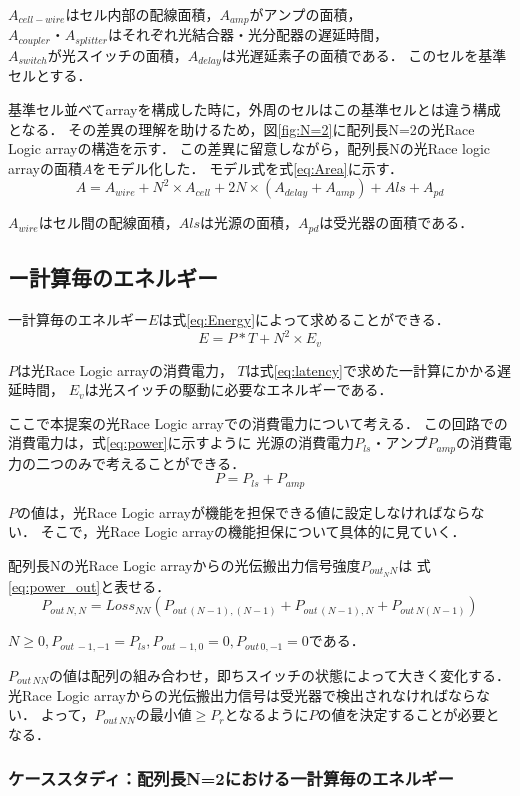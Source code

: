 $A_{cell-wire}はセル内部の配線面積，A_{amp}がアンプの面積，$
$A_{coupler}・A_{splitter}はそれぞれ光結合器・光分配器の遅延時間，$
$A_{switch}が光スイッチの面積，A_{delay}は光遅延素子の面積である．$
このセルを基準セルとする．

基準セル並べてarrayを構成した時に，外周のセルはこの基準セルとは違う構成となる．
その差異の理解を助けるため，図\ref{fig:N=2}に配列長N=2の光Race Logic arrayの構造を示す．
この差異に留意しながら，配列長Nの光Race logic arrayの面積$A$をモデル化した．
モデル式を式\ref{eq:Area}に示す．
\begin{equation}
A = A_{wire}+N^2 \times A_{cell} + 2N \times (A_{delay}+A_{amp}) +A{ls}+A_{pd}
\label{eq:Area}
\end{equation}

$A_{wire}はセル間の配線面積，A{ls}は光源の面積，A_{pd}は受光器の面積である．$

\subsection{ー計算毎のエネルギー}
一計算毎のエネルギー$E$は式\ref{eq:Energy}によって求めることができる．
\begin{equation}
E=P*T+N^2 \times E_{v}
\label{eq:Energy}
\end{equation}

$P$は光Race Logic arrayの消費電力，
$T$は式\ref{eq:latency}で求めた一計算にかかる遅延時間，
$E_{v}は光スイッチの駆動に必要なエネルギーである．$

ここで本提案の光Race Logic arrayでの消費電力について考える．
この回路での消費電力は，式\ref{eq:power}に示すように
$光源の消費電力P_{ls}・アンプP_{amp}$の消費電力の二つのみで考えることができる．
\begin{equation}
P=P_{ls}+P_{amp}
\label{eq:power}
\end{equation}

$P$の値は，光Race Logic arrayが機能を担保できる値に設定しなければならない．
そこで，光Race Logic arrayの機能担保について具体的に見ていく．

配列長Nの光Race Logic arrayからの光伝搬出力信号強度$P_{out_NN}$は
式\ref{eq:power_out}と表せる．
\begin{equation}
P_{out\,N,N}=Loss_{NN}(P_{out\,(N-1),(N-1)}+P_{out\,(N-1),N}+P_{out\,N(N-1)})
\label{eq:power_out}
\end{equation}

$N \geq 0,P_{out\,-1,-1}=P_{ls},P_{out\,-1,0}=0,P_{out\,0,-1}=0である．$

$P_{out\,NN}$の値は配列の組み合わせ，即ちスイッチの状態によって大きく変化する．
光Race Logic arrayからの光伝搬出力信号は受光器で検出されなければならない．
よって，$P_{out\,NN}の最小値 \geq P_{r}となるようにP$の値を決定することが必要となる．

\subsubsection{ケーススタディ：配列長N=2における一計算毎のエネルギー}


